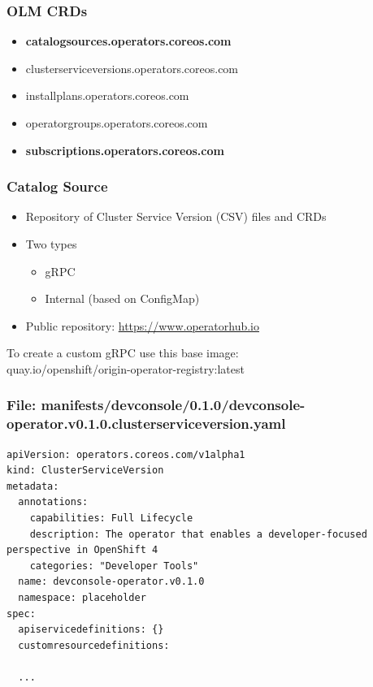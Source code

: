 \documentclass[aspectratio=169]{beamer}
\begin{document}
\begin{frame}
  \frametitle{OLM CRDs}
  \begin{itemize}
    \item {\bf catalogsources.operators.coreos.com}
    \item clusterserviceversions.operators.coreos.com
    \item installplans.operators.coreos.com
    \item operatorgroups.operators.coreos.com
    \item {\bf subscriptions.operators.coreos.com}
  \end{itemize}
\end{frame}


\begin{frame}

  \frametitle{Catalog Source}

  \begin{itemize}
  \item Repository of Cluster Service Version (CSV) files and CRDs
  \item Two types
    \begin{itemize}
    \item gRPC
    \item Internal (based on ConfigMap)
    \end{itemize}
  \item Public repository: \url{https://www.operatorhub.io}
  \end{itemize}

  To create a custom gRPC use this base image:\\
  quay.io/openshift/origin-operator-registry:latest

\end{frame}

\begin{frame}[fragile]

  \frametitle{File: manifests/devconsole/0.1.0/devconsole-operator.v0.1.0.clusterserviceversion.yaml}

  \begin{Verbatim}[fontsize=\small]
apiVersion: operators.coreos.com/v1alpha1
kind: ClusterServiceVersion
metadata:
  annotations:
    capabilities: Full Lifecycle
    description: The operator that enables a developer-focused perspective in OpenShift 4
    categories: "Developer Tools"
  name: devconsole-operator.v0.1.0
  namespace: placeholder
spec:
  apiservicedefinitions: {}
  customresourcedefinitions:

  ...
  \end{Verbatim}
\end{frame}
\end{document}
